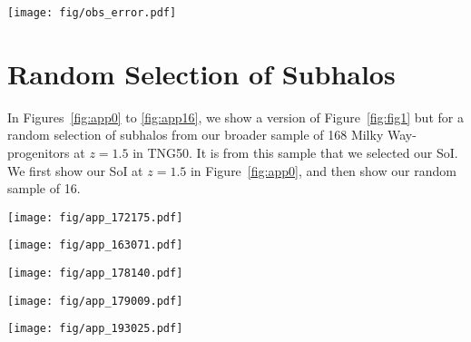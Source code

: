 \documentclass[twocolumn]{aastex631}
\newcommand{\dex}{\ensuremath{\textrm{dex}}}
\begin{document}
\begin{figure*}
  \centering
  \texttt{[image: fig/obs\_error.pdf]}
  \caption{The observational errors of the APOKASC2 (left) and ASPCAP dataset (right). We show, on the left, a line indicating a $15\%$ error in observed age and on the right a vertical line indicating a $0.01\,\dex$ error.}
  \label{fig:obs_err}
\end{figure*}

\section{Random Selection of Subhalos}\label{app:rand_fig1}
In Figures~\ref{fig:app0} to \ref{fig:app16}, we show a version of Figure~\ref{fig:fig1} but for a random selection of subhalos from our broader sample of 168 Milky Way-progenitors at $z=1.5$ in TNG50. It is from this sample that we selected our SoI. We first show our SoI at $z=1.5$ in Figure~\ref{fig:app0}, and then show our random sample of 16.

\begin{figure*}
  \centering
  \texttt{[image: fig/app\_172175.pdf]}
  \caption{The same as Figure~\ref{fig:fig1}, but for our SoI at $z=1.5$.}
  \label{fig:app0}
\end{figure*}

\begin{figure*}
  \centering
  \texttt{[image: fig/app\_163071.pdf]}
  \caption{The same as Figure~\ref{fig:fig1}, but for a random subhalo from our catalog at $z=1.5$.}
  \label{fig:app1}
\end{figure*}

\begin{figure*}
  \centering
  \texttt{[image: fig/app\_178140.pdf]}
  \caption{The same as Figure~\ref{fig:fig1}, but for a random subhalo from our catalog at $z=1.5$.}
  \label{fig:app2}
\end{figure*}

\begin{figure*}
  \centering
  \texttt{[image: fig/app\_179009.pdf]}
  \caption{The same as Figure~\ref{fig:fig1}, but for a random subhalo from our catalog at $z=1.5$.}
  \label{fig:app3}
\end{figure*}

\begin{figure*}
  \centering
  \texttt{[image: fig/app\_193025.pdf]}
  \caption{The same as Figure~\ref{fig:fig1}, but for a random subhalo from our catalog at $z=1.5$.}
  \label{fig:app4}
\end{figure*}
\end{document}
